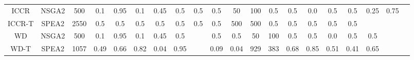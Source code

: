 \begin{table}
{\begin{tabular}{c c c c c c c c c c c c c c c c c c c c}
			ICCR & NSGA2 & 500 & 0.1 & 0.95 & 0.1 & 0.45 & 0.5 & 0.5 & 0.5 & 50 & 100 & 0.5 & 0.5 & 0.0 & 0.5 & 0.5 & 0.25 & 0.75 \\
			
			ICCR-T & SPEA2 & 2550 & 0.5 & 0.5 & 0.5 & 0.5 & 0.5 & 0.5 & 0.5 & 500 & 500 & 0.5 & 0.5 & 0.5 & 0.5 & 0.5 \\
					
			WD & NSGA2 & 500 & 0.1 & 0.95 & 0.1 & 0.45 & 0.5 & & 0.5 & 0.5 & 50 & 100 & 0.5 & 0.5 & 0.0 & 0.5 & 0.5 \\
			
			WD-T & SPEA2 & 1057 & 0.49 & 0.66 & 0.82 & 0.04 & 0.95 & & 0.09 & 0.04 & 929 & 383 & 0.68 & 0.85 & 0.51 & 0.41 & 0.65 \\
			\hline
		\end{tabular}
	}
\end{table}


